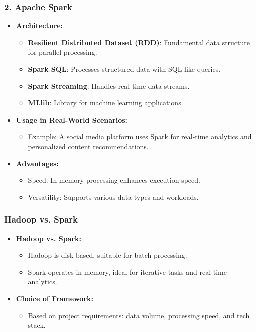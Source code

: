 \documentclass{beamer}
\begin{document}
\begin{frame}[fragile]
    \frametitle{2. Apache Spark}
    \begin{itemize}
        \item \textbf{Architecture:}
        \begin{itemize}
            \item \textbf{Resilient Distributed Dataset (RDD)}: Fundamental data structure for parallel processing.
            \item \textbf{Spark SQL}: Processes structured data with SQL-like queries.
            \item \textbf{Spark Streaming}: Handles real-time data streams.
            \item \textbf{MLlib}: Library for machine learning applications.
        \end{itemize}
        
        \item \textbf{Usage in Real-World Scenarios:}
        \begin{itemize}
            \item Example: A social media platform uses Spark for real-time analytics and personalized content recommendations.
        \end{itemize}
        
        \item \textbf{Advantages:}
        \begin{itemize}
            \item Speed: In-memory processing enhances execution speed.
            \item Versatility: Supports various data types and workloads.
        \end{itemize}
    \end{itemize}
\end{frame}

\begin{frame}[fragile]
    \frametitle{Hadoop vs. Spark}
    \begin{itemize}
        \item \textbf{Hadoop vs. Spark:}
        \begin{itemize}
            \item Hadoop is disk-based, suitable for batch processing.
            \item Spark operates in-memory, ideal for iterative tasks and real-time analytics.
        \end{itemize}
        
        \item \textbf{Choice of Framework:}
        \begin{itemize}
            \item Based on project requirements: data volume, processing speed, and tech stack.
        \end{itemize}
    \end{itemize}
\end{frame}
\end{document}
